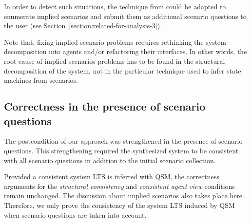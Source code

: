 \begin{itemize}
In order to detect such situations, the technique from \cite{Uchitel:2004} could be adapted to enumerate implied scenarios and submit them as additional scenario questions to the user (see Section~\ref{section:related-for-analysis-3}). 

Note that, fixing implied scenario problems requires rethinking the system decomposition into agents and/or refactoring their interfaces. In other words, the root cause of implied scenarios problems has to be found in the structural decomposition of the system, not in the particular technique used to infer state machines from scenarios. 

\end{itemize}


\subsection{Correctness in the presence of scenario questions\label{subsection:proof-with-scenario-questions}}

The postcondition of our approach was strengthened in the presence of scenario questions. This strengthening required the synthesized system to be consistent with all scenario questions in addition to the initial scenario collection. 

Provided a consistent system LTS is inferred with QSM, the correctness arguments for the \emph{structural consistency} and \emph{consistent agent view} conditions remain unchanged. The discussion about implied scenarios also takes place here. Therefore, we only prove the consistency of the system LTS induced by QSM when scenario questions are taken into account.

